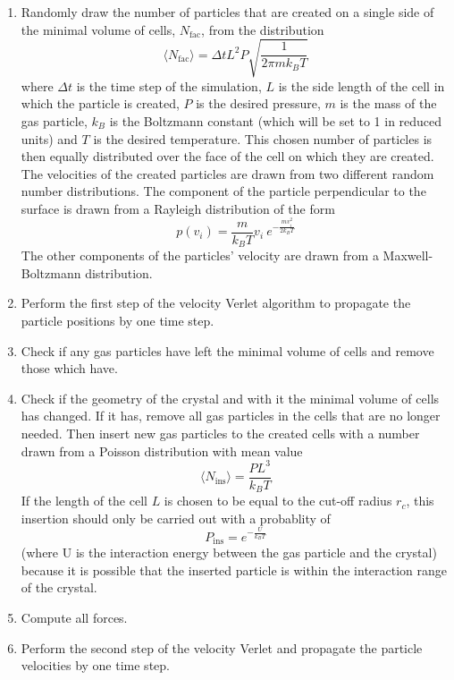 \documentclass[12pt]{article}
\begin{document}
\begin{enumerate}
    \item Randomly draw the number of particles that are created on a single side of the minimal volume of cells, $N_\text{fac}$, from the
        distribution 
        \begin{equation}
            \langle N_\text{fac}\rangle = \Delta t L^2 P \sqrt{\frac{1}{2\pi m k_B T}}
        \end{equation}
        where $\Delta t$ is the time step of the simulation, $L$ is the side length of the cell in which the particle is created, $P$ is the desired
        pressure, $m$ is the mass of the gas particle, $k_B$ is the Boltzmann constant (which will be set to 1 in reduced units) and $T$ is the
        desired temperature. This chosen number of particles is then equally distributed over the face of the cell on which they are created. The
        velocities of the created particles are drawn from two different random number distributions. The component of the particle perpendicular to
        the surface is drawn from a Rayleigh distribution of the form 
        \begin{equation}
            p(v_i) = \frac{m}{k_B T}v_i \ e^{-\frac{mv_i^2}{2k_BT}}
        \end{equation}
        The other components of the particles' velocity are drawn from a Maxwell-Boltzmann distribution.
    \item Perform the first step of the velocity Verlet algorithm to propagate the particle positions by one time step.
    \item Check if any gas particles have left the minimal volume of cells and remove those which have.
    \item Check if the geometry of the crystal and with it the minimal volume of cells has changed. If it has, remove all gas particles in the cells
        that are no longer needed. Then insert new gas particles to the created cells with a number drawn from a Poisson distribution with mean value
        \begin{equation}
            \langle N_\text{ins}\rangle = \frac{PL^3}{k_BT}
        \end{equation}
        If the length of the cell $L$ is chosen to be equal to the cut-off radius $r_c$, this insertion should only be carried out with a probablity of
        \begin{equation}
            P_\text{ins} = e^{-\frac{U}{k_BT}}
        \end{equation}
        (where U is the interaction energy between the gas particle and the crystal) because it is possible that the inserted particle is 
        within the interaction range of the crystal. 
    \item Compute all forces.
    \item Perform the second step of the velocity Verlet and propagate the particle velocities by one time step. 
\end{enumerate}
\end{document}
